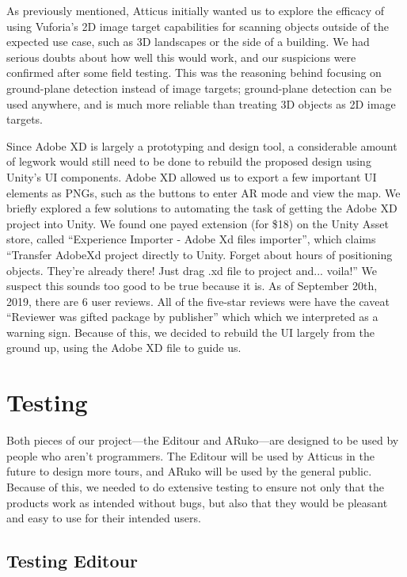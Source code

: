 \documentclass[a4paper, 10pt, american, titlepage]{article}
\begin{document}
As previously mentioned, Atticus initially wanted us to explore the efficacy of
using Vuforia's 2D image target capabilities for scanning objects outside of
the expected use case, such as 3D landscapes or the side of a building. We had
serious doubts about how well this would work, and our suspicions were
confirmed after some field testing. This was the reasoning behind focusing on
ground-plane detection instead of image targets; ground-plane detection can be
used anywhere, and is much more reliable than treating 3D objects as 2D image
targets.

Since Adobe XD is largely a prototyping and design tool, a considerable amount
of legwork would still need to be done to rebuild the proposed design using
Unity's UI components. Adobe XD allowed us to export a few important UI
elements as PNGs, such as the buttons to enter AR mode and view the map. We
briefly explored a few solutions to automating the task of getting the Adobe XD
project into Unity. We found one payed extension (for \$18) on the Unity Asset
store, called ``Experience Importer - Adobe Xd files importer'', which claims
``Transfer AdobeXd project directly to Unity. Forget about hours of positioning
objects. They're already there! Just drag .xd file to project and... voila!''
We suspect this sounds too good to be true because it is. As of September 20th,
2019, there are 6 user reviews. All of the five-star reviews were have the
caveat ``Reviewer was gifted package by publisher'' which which we interpreted
as a warning sign. Because of this, we decided to rebuild the UI largely from
the ground up, using the Adobe XD file to guide us.

\newpage

\section{Testing}
\label{sec:testing}

Both pieces of our project---the Editour and ARuko---are designed to be used by
people who aren't programmers. The Editour will be used by Atticus in the future
to design more tours, and ARuko will be used by the general public. Because of
this, we needed to do extensive testing to ensure not only that the products
work as intended without bugs, but also that they would be pleasant and easy to
use for their intended users.

\subsection{Testing Editour}
\label{sec:testingEditour}
\end{document}
